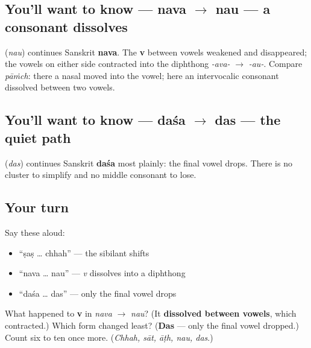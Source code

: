 \subsection*{You'll want to know — nava $\to$ nau — a consonant dissolves}
\textbf{} (\emph{nau}) continues Sanskrit \textbf{nava}. The \textbf{v} between vowels weakened and disappeared; the vowels on either side contracted into the diphthong \emph{-ava-} $\to$ \emph{-au-}. Compare \emph{pāṁch}: there a nasal moved into the vowel; here an intervocalic consonant dissolved between two vowels.

\subsection*{You'll want to know — daśa $\to$ das — the quiet path}
\textbf{} (\emph{das}) continues Sanskrit \textbf{daśa} most plainly: the final vowel drops. There is no cluster to simplify and no middle consonant to lose.

\subsection*{Your turn}
Say these aloud:

\begin{itemize}
\raggedright
  \item \textquotedblleft{}ṣaṣ … chhah\textquotedblright{} — the sibilant shifts
  \item \textquotedblleft{}nava … nau\textquotedblright{} — \emph{v} dissolves into a diphthong
  \item \textquotedblleft{}daśa … das\textquotedblright{} — only the final vowel drops
\end{itemize}

\begin{tcolorbox}[breakable,colback=teal!4,colframe=teal!35!black,title={Before you move on}]
What happened to \textbf{v} in \emph{nava} $\to$ \emph{nau}? (It \textbf{dissolved between vowels}, which contracted.) Which form changed least? (\textbf{Das} — only the final vowel dropped.) Count six to ten once more. (\emph{Chhah, sāt, āṭh, nau, das}.)
\end{tcolorbox}
